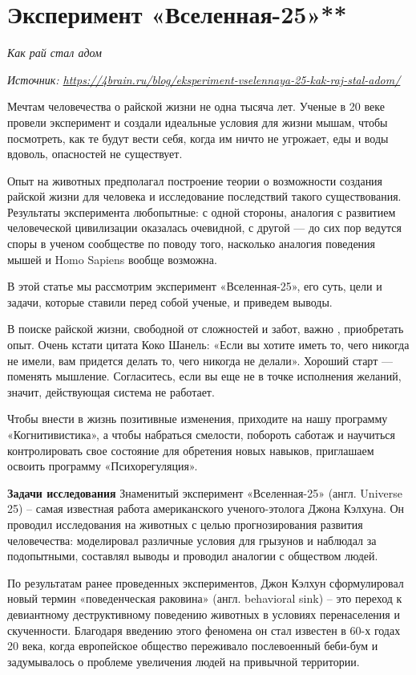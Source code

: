 \clearpage
\section{Эксперимент «Вселенная-25»**}

\textit{Как рай стал адом}

\textit{Источник: \url{https://4brain.ru/blog/eksperiment-vselennaya-25-kak-raj-stal-adom/}}

Мечтам человечества о райской жизни не одна тысяча лет. Ученые в 20 веке провели эксперимент и создали идеальные условия для жизни мышам, чтобы посмотреть, как те будут вести себя, когда им ничто не угрожает, еды и воды вдоволь, опасностей не существует.

Опыт на животных предполагал построение теории о возможности создания райской жизни для человека и исследование последствий такого существования. Результаты эксперимента любопытные: с одной стороны, аналогия с развитием человеческой цивилизации оказалась очевидной, с другой --- до сих пор ведутся споры в ученом сообществе по поводу того, насколько аналогия поведения мышей и Homo Sapiens вообще возможна.

В этой статье мы рассмотрим эксперимент «Вселенная-25», его суть, цели и задачи, которые ставили перед собой ученые, и приведем выводы.

В поиске райской жизни, свободной от сложностей и забот, важно , приобретать опыт. Очень кстати цитата Коко Шанель: «Если вы хотите иметь то, чего никогда не имели, вам придется делать то, чего никогда не делали». Хороший старт --- поменять мышление. Согласитесь, если вы еще не в точке исполнения желаний, значит, действующая система не работает.

Чтобы внести в жизнь позитивные изменения, приходите на нашу программу «Когнитивистика», а чтобы набраться смелости, побороть саботаж и научиться контролировать свое состояние для обретения новых навыков, приглашаем освоить программу «Психорегуляция».

\textbf{Задачи исследования}
Знаменитый эксперимент «Вселенная-25» (англ. Universe 25) – самая известная работа американского ученого-этолога Джона  Кэлхуна. Он проводил исследования на животных с целью прогнозирования развития человечества: моделировал различные условия для грызунов и наблюдал за подопытными, составлял выводы и проводил аналогии с обществом людей.

По результатам ранее проведенных экспериментов, Джон  Кэлхун сформулировал новый термин «поведенческая раковина» (англ. behavioral sink) – это переход к девиантному деструктивному поведению животных в условиях перенаселения и скученности. Благодаря введению этого феномена он стал известен в 60-х годах 20 века, когда европейское общество переживало послевоенный беби-бум и задумывалось о проблеме увеличения  людей на привычной территории.

